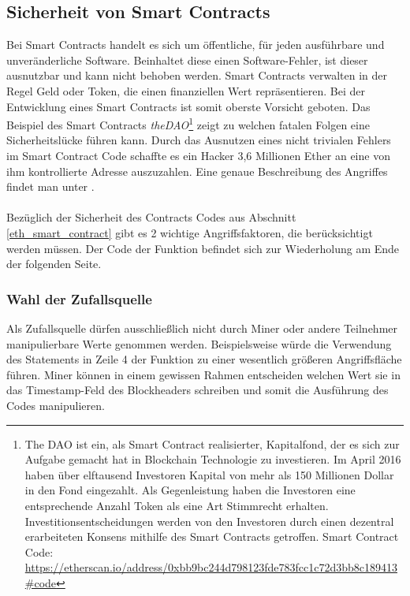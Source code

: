 \subsection{Sicherheit von Smart Contracts}
Bei Smart Contracts handelt es sich um öffentliche, für jeden ausführbare und unveränderliche Software. Beinhaltet diese einen Software-Fehler, ist dieser ausnutzbar und kann nicht behoben werden. Smart Contracts verwalten in der Regel Geld oder Token, die einen finanziellen Wert repräsentieren. Bei der Entwicklung eines Smart Contracts ist somit oberste Vorsicht geboten. Das Beispiel des Smart Contracts \textit{theDAO}\footnote{The DAO ist ein, als Smart Contract realisierter, Kapitalfond, der es sich zur Aufgabe gemacht hat in Blockchain Technologie zu investieren. Im April 2016 haben über elftausend Investoren Kapital von mehr als 150 Millionen Dollar in den Fond eingezahlt. Als Gegenleistung haben die Investoren eine entsprechende Anzahl Token als eine Art Stimmrecht erhalten. Investitionsentscheidungen werden von den Investoren durch einen dezentral erarbeiteten Konsens mithilfe des Smart Contracts getroffen. Smart Contract Code: \url{https://etherscan.io/address/0xbb9bc244d798123fde783fcc1c72d3bb8c189413\#code}} zeigt zu welchen fatalen Folgen eine Sicherheitslücke führen kann. Durch das Ausnutzen eines nicht trivialen Fehlers im Smart Contract Code schaffte es ein Hacker 3,6 Millionen Ether an eine von ihm kontrollierte Adresse auszuzahlen. Eine genaue Beschreibung des Angriffes findet man unter \cite{eth_dao_hack}.\\\\
Bezüglich der Sicherheit des Contracts Codes aus Abschnitt \ref{eth_smart_contract} gibt es 2 wichtige Angriffsfaktoren, die berücksichtigt werden müssen. Der Code der  Funktion befindet sich zur Wiederholung am Ende der folgenden Seite.


\subsubsection{Wahl der Zufallsquelle}
Als Zufallsquelle dürfen ausschließlich nicht durch Miner oder andere Teilnehmer manipulierbare Werte genommen werden. Beispielsweise würde die Verwendung des Statements  in Zeile 4 der  Funktion zu einer wesentlich größeren Angriffsfläche führen. Miner können in einem gewissen Rahmen entscheiden welchen Wert sie in das Timestamp-Feld des Blockheaders schreiben und somit die Ausführung des Codes manipulieren.

